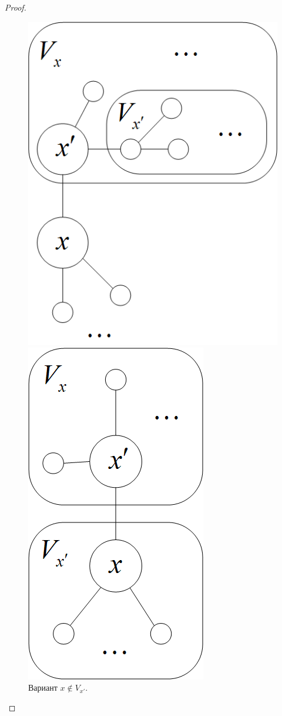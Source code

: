 \begin{proof}
\begin{figure}[htb!]
\centering
\begin{minipage}[b]{6cm}
\centering
\includegraphics[scale=1.0]{images/tree_division.png}
\caption{Вариант $x \notin V_{x'}$.}
\label{fig:tree_division}
\end{minipage}
\hspace{0.5cm}
\begin{minipage}[b]{6cm}
\centering
\includegraphics[scale=1.0]{images/tree_division_2.png}

\end{minipage}
\end{figure}
\end{proof}
